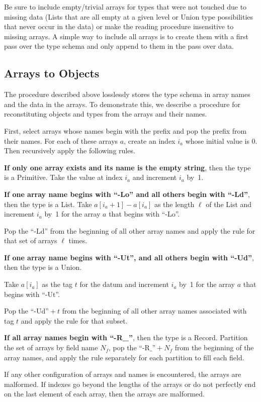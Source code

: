 \documentclass[10pt, conference, compsocconf]{IEEEtran}
\begin{document}
Be sure to include empty/trivial arrays for types that were not touched due to missing data (Lists that are all empty at a given level or Union type possibilities that never occur in the data) or make the reading procedure insensitive to missing arrays. A simple way to include all arrays is to create them with a first pass over the type schema and only append to them in the pass over data.

\subsection{Arrays to Objects}

The procedure described above losslessly stores the type schema in array names and the data in the arrays. To demonstrate this, we describe a procedure for reconstituting objects and types from the arrays and their names.

First, select arrays whose names begin with the prefix and pop the prefix from their names. For each of these arrays $a$, create an index $i_a$ whose initial value is 0. Then recursively apply the following rules.

{\bf If only one array exists and its name is the empty string}, then the type is a Primitive. Take the value at index $i_a$ and increment $i_a$ by~1.

{\bf If one array name begins with ``-Lo'' and all others begin with ``-Ld''}, then the type is a List. Take $a[i_a + 1] - a[i_a]$ as the length $\ell$ of the List and increment $i_a$ by~1 for the array $a$ that begins with ``-Lo''.

Pop the ``-Ld'' from the beginning of all other array names and apply the rule for that set of arrays $\ell$ times.

{\bf If one array name begins with ``-Ut'', and all others begin with ``-Ud''}, then the type is a Union.

Take $a[i_a]$ as the tag $t$ for the datum and increment $i_a$ by~1 for the array $a$ that begins with ``-Ut''.

Pop the $\mbox{``-Ud''} + t$ from the beginning of all other array names associated with tag $t$ and apply the rule for that subset.

{\bf If all array names begin with ``-R\_''}, then the type is a Record. Partition the set of arrays by field name $N_f$, pop the $\mbox{``-R\_''} + N_f$ from the beginning of the array names, and apply the rule separately for each partition to fill each field.

If any other configuration of arrays and names is encountered, the arrays are malformed. If indexes go beyond the lengths of the arrays or do not perfectly end on the last element of each array, then the arrays are malformed.
\end{document}
